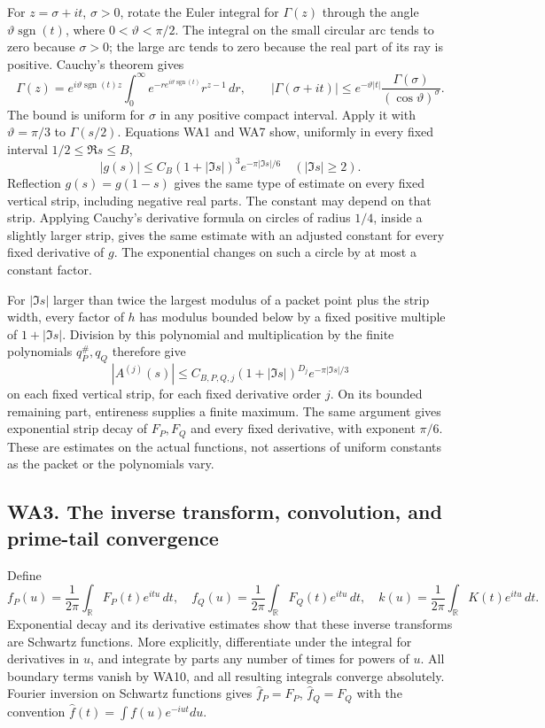 \documentclass[
  10pt,
  a4paper,
]{article}
\begin{document}
For \(z=\sigma+it\), \(\sigma>0\), rotate the Euler integral for
\(\Gamma(z)\) through the angle \(\vartheta\operatorname{sgn}(t)\),
where \(0<\vartheta<\pi/2\). The integral on the small circular arc
tends to zero because \(\sigma>0\); the large arc tends to zero because
the real part of its ray is positive. Cauchy's theorem gives \[
\Gamma(z)=e^{i\vartheta\operatorname{sgn}(t)z}
\int_0^\infty e^{-r e^{i\vartheta\operatorname{sgn}(t)}}r^{z-1}\,dr,
\qquad
|\Gamma(\sigma+it)|\le e^{-\vartheta|t|}
\frac{\Gamma(\sigma)}{(\cos\vartheta)^\sigma}.
\tag{WA8}
\] The bound is uniform for \(\sigma\) in any positive compact interval.
Apply it with \(\vartheta=\pi/3\) to \(\Gamma(s/2)\). Equations WA1 and
WA7 show, uniformly in every fixed interval \(1/2\le\Re s\le B\), \[
|g(s)|\le C_B(1+|\Im s|)^3 e^{-\pi|\Im s|/6}
\quad(|\Im s|\ge2).
\tag{WA9}
\] Reflection \(g(s)=g(1-s)\) gives the same type of estimate on every
fixed vertical strip, including negative real parts. The constant may
depend on that strip. Applying Cauchy's derivative formula on circles of
radius \(1/4\), inside a slightly larger strip, gives the same estimate
with an adjusted constant for every fixed derivative of \(g\). The
exponential changes on such a circle by at most a constant factor.

For \(|\Im s|\) larger than twice the largest modulus of a packet point
plus the strip width, every factor of \(h\) has modulus bounded below by
a fixed positive multiple of \(1+|\Im s|\). Division by this polynomial
and multiplication by the finite polynomials \(q_P^\#,q_Q\) therefore
give \[
|A^{(j)}(s)|\le C_{B,P,Q,j}(1+|\Im s|)^{D_j}e^{-\pi|\Im s|/3}
\tag{WA10}
\] on each fixed vertical strip, for each fixed derivative order \(j\).
On its bounded remaining part, entireness supplies a finite maximum. The
same argument gives exponential strip decay of \(F_P,F_Q\) and every
fixed derivative, with exponent \(\pi/6\). These are estimates on the
actual functions, not assertions of uniform constants as the packet or
the polynomials vary.

\subsection{WA3. The inverse transform, convolution, and prime-tail
convergence}\label{wa3.-the-inverse-transform-convolution-and-prime-tail-convergence}

Define \[
f_P(u)=\frac1{2\pi}\int_{\mathbb R}F_P(t)e^{itu}\,dt,
\quad f_Q(u)=\frac1{2\pi}\int_{\mathbb R}F_Q(t)e^{itu}\,dt,
\quad k(u)=\frac1{2\pi}\int_{\mathbb R}K(t)e^{itu}\,dt.
\tag{WA11}
\] Exponential decay and its derivative estimates show that these
inverse transforms are Schwartz functions. More explicitly,
differentiate under the integral for derivatives in \(u\), and integrate
by parts any number of times for powers of \(u\). All boundary terms
vanish by WA10, and all resulting integrals converge absolutely. Fourier
inversion on Schwartz functions gives \(\widehat f_P=F_P\),
\(\widehat f_Q=F_Q\) with the convention
\(\widehat f(t)=\int f(u)e^{-iut}du\).
\end{document}
